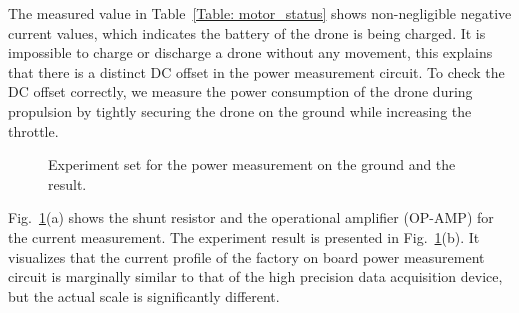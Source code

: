\documentclass[journal]{./template/IEEEtran}
\begin{document}
\begin{table}[ht]
\caption{An example of inaccurate data from the genuine flight module of M600 drone while it parks as a ready state on the ground. (All motors and propellers are fully stopped.)}
\label{Table: motor_status}
\end{table}

The measured value in Table~\ref{Table: motor_status} shows non-negligible negative current values, which indicates the battery of the drone is being charged.
It is impossible to charge or discharge a drone without any movement, this explains that there is a distinct DC offset in the power measurement circuit.
To check the DC offset correctly, we measure the power consumption of the drone during propulsion by tightly securing the drone on the ground while increasing the throttle.

\begin{figure}[ht]
\centering
{}
\qquad
{}
\caption{Experiment set for the power measurement on the ground and the result.}
\label{fig:Ground_test}
\end{figure}

Fig.~\ref{fig:Ground_test}(a) shows the shunt resistor and the operational amplifier (OP-AMP) for the current measurement. 
The experiment result is presented in Fig.~\ref{fig:Ground_test}(b). 
It visualizes that the current profile of the factory on board power measurement circuit is marginally similar to that of the high precision data acquisition device, but the actual scale is significantly different. 
\end{document}

